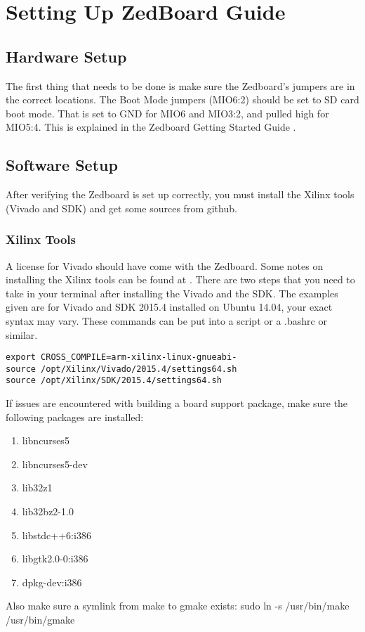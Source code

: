\documentclass[thesis.tex]{subfile}
\begin{document}
\chapter{Setting Up ZedBoard Guide}

\section{Hardware Setup}
The first thing that needs to be done is make sure the Zedboard's jumpers are in the correct locations.
The Boot Mode jumpers (MIO6:2) should be set to SD card boot mode.
That is set to GND for MIO6 and MIO3:2, and pulled high for MIO5:4.
This is explained in the Zedboard Getting Started Guide \cite{ZedGetStarted}.

\section{Software Setup}
After verifying the Zedboard is set up correctly, you must install the Xilinx tools (Vivado and SDK) and get some sources from github.

\subsection{Xilinx Tools} A license for Vivado should have come with the Zedboard.
Some notes on installing the Xilinx tools can be found at \cite{InstallTools}.
There are two steps that you need to take in your terminal after installing the Vivado and the SDK.
The examples given are for Vivado and SDK 2015.4 installed on Ubuntu 14.04, your exact syntax may vary. These commands can be put into a script or a .bashrc or similar.

\begin{lstlisting}
export CROSS_COMPILE=arm-xilinx-linux-gnueabi-
source /opt/Xilinx/Vivado/2015.4/settings64.sh
source /opt/Xilinx/SDK/2015.4/settings64.sh
\end{lstlisting}

If issues are encountered with building a board support package, make sure the following packages are installed:
\begin{enumerate}
\item libncurses5
\item libncurses5-dev
\item lib32z1
\item lib32bz2-1.0
\item libstdc++6:i386
\item libgtk2.0-0:i386
\item dpkg-dev:i386
\end{enumerate}
Also make sure a symlink from make to gmake exists: sudo ln -s /usr/bin/make /usr/bin/gmake
\end{document}
